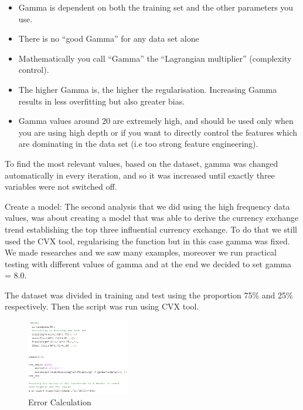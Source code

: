 \begin{itemize}
\item Gamma is dependent on both the training set and the other parameters you use.
\item There is no “good Gamma” for any data set alone
\item Mathematically you call “Gamma” the “Lagrangian multiplier” (complexity control).
\item The higher Gamma is, the higher the regularisation. Increasing Gamma results in less overfitting but also greater bias.
\item Gamma values around 20 are extremely high, and should be used only when you are using high depth or if you want to directly control the features which are dominating in the data set (i.e too strong feature engineering). 

\end{itemize}

To find the most relevant values, based on the dataset, gamma was changed automatically in every iteration, and so it was increased until exactly three variables were not switched off.

Create a model:
\newline
The second analysis that we did using the high frequency data values, was about creating a model that was able to derive the currency exchange trend establishing the top three influential currency exchange. To do that we still used the CVX tool, regularising the function but in this case gamma was fixed. We made researches and we saw many examples, moreover we run practical testing with different values of gamma and at the end we decided to set gamma = 8.0.

The dataset was divided in training and test using the proportion 75\% and 25\% respectively.  Then the script was run using CVX tool. 

\begin{figure}[!h]
	\begin{center}
		\includegraphics[width=0.4\textwidth]{error.png}
		\caption{Error Calculation}
		\label{error_calc}
	\end{center}
\end{figure}

